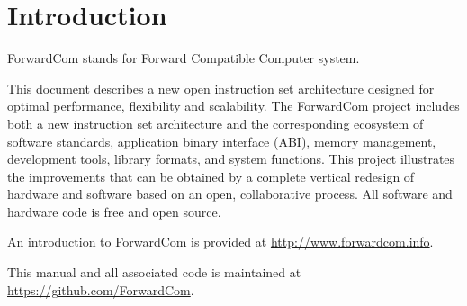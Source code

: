 \documentclass[forwardcom.tex]{subfiles}
\begin{document}
\RaggedRight

\chapter{Introduction}
ForwardCom stands for Forward Compatible Computer system.
\vv

This document describes a new open instruction set architecture designed for optimal performance, flexibility and scalability. The ForwardCom project includes both a new instruction set architecture and the corresponding ecosystem of software standards, application binary interface (ABI), memory management, development tools, library formats, and system functions. This project illustrates the improvements that can be obtained by a complete vertical redesign of hardware and software based on an open, collaborative process. All software and hardware code is free and open source.
\vv

An introduction to ForwardCom is provided at 
\href{http://www.forwardcom.info}{http://www.forwardcom.info}.
\vv

This manual and all associated code is maintained at 
\href{https://github.com/ForwardCom/}{https://github.com/ForwardCom}.

 
\end{document}
